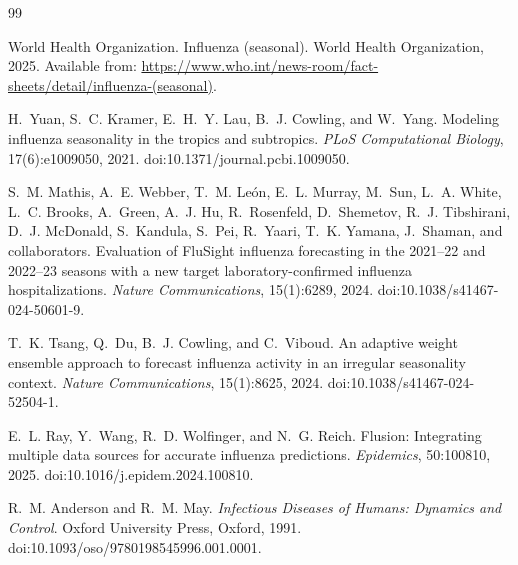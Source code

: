 \documentclass[12pt,a4paper]{article}
\theoremstyle{definition}
\theoremstyle{remark}
\begin{document}






\begin{thebibliography}{99}


World Health Organization.
\newblock Influenza (seasonal).
\newblock World Health Organization, 2025.
\newblock Available from: \url{https://www.who.int/news-room/fact-sheets/detail/influenza-(seasonal)}.

H.~Yuan, S.~C. Kramer, E.~H.~Y. Lau, B.~J. Cowling, and W.~Yang.
\newblock Modeling influenza seasonality in the tropics and subtropics.
\newblock \emph{PLoS Computational Biology}, 17(6):e1009050, 2021.
\newblock doi:10.1371/journal.pcbi.1009050.


S.~M. Mathis, A.~E. Webber, T.~M. León, E.~L. Murray, M.~Sun, L.~A. White,
L.~C. Brooks, A.~Green, A.~J. Hu, R.~Rosenfeld, D.~Shemetov, R.~J. Tibshirani,
D.~J. McDonald, S.~Kandula, S.~Pei, R.~Yaari, T.~K. Yamana, J.~Shaman,
and collaborators.
\newblock Evaluation of FluSight influenza forecasting in the 2021--22 and 2022--23 seasons with a new target laboratory-confirmed influenza hospitalizations.
\newblock \emph{Nature Communications}, 15(1):6289, 2024.
\newblock doi:10.1038/s41467-024-50601-9.

T.~K. Tsang, Q.~Du, B.~J. Cowling, and C.~Viboud.
\newblock An adaptive weight ensemble approach to forecast influenza activity in an irregular seasonality context.
\newblock \emph{Nature Communications}, 15(1):8625, 2024.
\newblock doi:10.1038/s41467-024-52504-1.

E.~L. Ray, Y.~Wang, R.~D. Wolfinger, and N.~G. Reich.
\newblock Flusion: Integrating multiple data sources for accurate influenza predictions.
\newblock \emph{Epidemics}, 50:100810, 2025.
\newblock doi:10.1016/j.epidem.2024.100810.




R.~M. Anderson and R.~M. May.
\newblock \emph{Infectious Diseases of Humans: Dynamics and Control}.
\newblock Oxford University Press, Oxford, 1991.
\newblock doi:10.1093/oso/9780198545996.001.0001.


\end{thebibliography}
\end{document}
